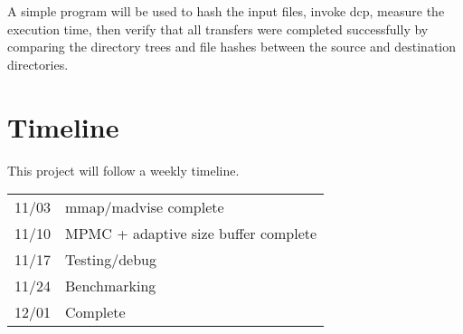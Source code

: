 \documentclass[12pt]{article}
\begin{document}
A simple program will be used to hash the input files, invoke dcp, measure the
execution time, then verify that all transfers were completed
successfully by comparing the directory trees and file hashes between
the source and destination directories.

\section{Timeline}
This project will follow a weekly timeline. \\
\begin{tabular}{|l | l|}
\hline
11/03 & mmap/madvise complete \\
11/10 & MPMC + adaptive size buffer complete \\
11/17 & Testing/debug \\
11/24 & Benchmarking \\
12/01 & Complete \\
\hline
\end{tabular}
\end{document}
